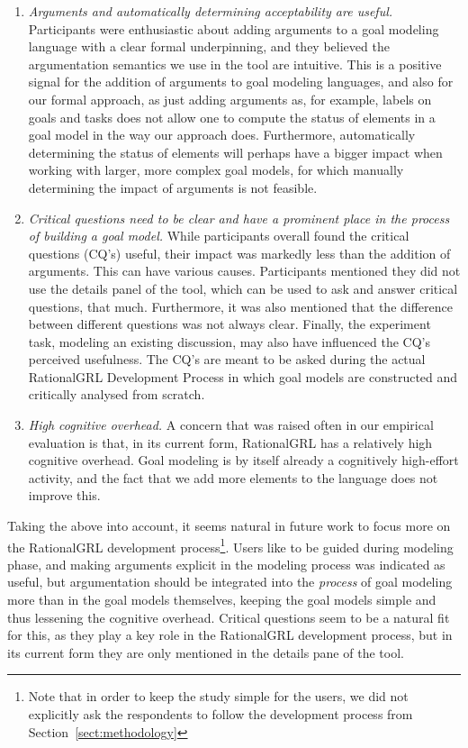 \begin{enumerate}
\item \emph{Arguments and automatically determining acceptability are useful.} Participants were enthusiastic about adding arguments to a goal modeling language with a clear formal underpinning, and they believed the argumentation semantics we use in the tool are intuitive. This is a positive signal for the addition of arguments to goal modeling languages, and also for our formal approach, as just adding arguments as, for example, labels on goals and tasks does not allow one to compute the status of elements in a goal model in the way our approach does. Furthermore, automatically determining the status of elements will perhaps have a bigger impact when working with larger, more complex goal models, for which manually determining the impact of arguments is not feasible.
\item \emph{Critical questions need to be clear and have a prominent place in the process of building a goal model.} While participants overall found the critical questions (CQ's) useful, their impact was markedly less than the addition of arguments. This can have various causes. Participants mentioned they did not use the details panel of the tool, which can be used to ask and answer critical questions, that much. Furthermore, it was also mentioned that the difference between different questions was not always clear. Finally, the experiment task, modeling an existing discussion, may also have influenced the CQ's perceived usefulness. The CQ's are meant to be asked during the actual RationalGRL Development Process in which goal models are constructed and critically analysed from scratch. 
\item \emph{High cognitive overhead.} A concern that was raised often in our empirical evaluation is that, in its current form, RationalGRL has a relatively high cognitive overhead. Goal modeling is by itself already a cognitively high-effort activity, and the fact that we add more elements to the language does not improve this. 
\end{enumerate}

Taking the above into account, it seems natural in future work to focus more on the RationalGRL development process\footnote{Note that in order to keep the study simple for the users, we did not explicitly ask the respondents to follow the development process from Section~\ref{sect:methodology}}. Users like to be guided during modeling phase, and making arguments explicit in the modeling process was indicated as useful, but argumentation should be integrated into the \emph{process} of goal modeling more than in the goal models themselves, keeping the goal models simple and thus lessening the cognitive overhead. Critical questions seem to be a natural fit for this, as they play a key role in the RationalGRL development process, but in its current form they are only mentioned in the details pane of the tool.



